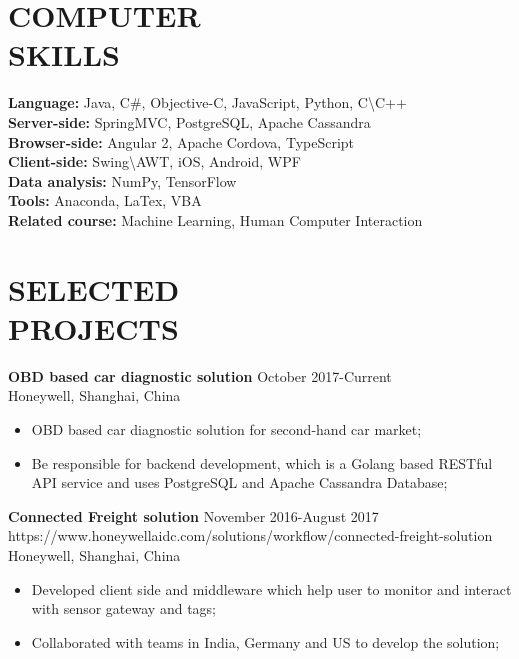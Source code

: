 \documentclass[margin, 10pt]{res} %
\begin{document}
\begin{resume}
\begin{CJK}{UTF8}{gbsn}
\section{COMPUTER \\ SKILLS}
\textbf{Language: }Java, C\#, Objective-C, JavaScript, Python, C\textbackslash C++\\
\textbf{Server-side: }SpringMVC, PostgreSQL, Apache Cassandra\\
\textbf{Browser-side: }Angular 2, Apache Cordova, TypeScript\\
\textbf{Client-side: }Swing\textbackslash AWT, iOS, Android, WPF\\
\textbf{Data analysis: }NumPy, TensorFlow\\
\textbf{Tools: }Anaconda, LaTex, VBA\\
\textbf{Related course:} Machine Learning, Human Computer Interaction


\section{SELECTED \\ PROJECTS}

\textbf{OBD based car diagnostic solution} \hfill October 2017-Current\\
Honeywell, Shanghai, China
\begin{itemize} \itemsep -2pt %
	\item OBD based car diagnostic solution for second-hand car market;
	\item Be responsible for backend development, which is a Golang based RESTful API service and uses PostgreSQL and Apache Cassandra Database;
\end{itemize}

\textbf{Connected Freight solution} \hfill November 2016-August 2017\\
https://www.honeywellaidc.com/solutions/workflow/connected-freight-solution\\
Honeywell, Shanghai, China
\begin{itemize} \itemsep -2pt %
\item Developed client side and middleware which help user to monitor and interact with sensor gateway and tags;
\item Collaborated with teams in India, Germany and US to develop the solution;
\end{itemize}


\end{CJK}
\end{resume}
\end{document}
